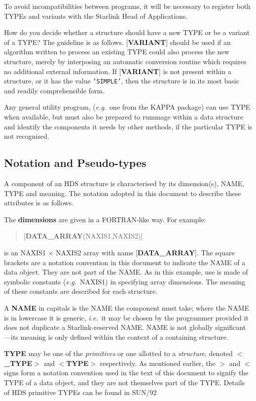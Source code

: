 \documentclass[twoside,11pt]{article}
\newcommand{\xref}[3]{#1}
\newcommand{\xlabel}[1]{}
\begin{document}
To avoid incompatibilities between programs, it will be necessary to
register both TYPEs and variants with the Starlink Head of Applications. 

How do you decide whether a structure should have
a new TYPE or be a variant of a TYPE?  The guideline is as
follows.  {[}{\bf VARIANT}{]} should be used
if an algorithm written to process an existing TYPE could also process
the new structure, merely by interposing an automatic conversion routine
which requires no additional external information.
If {[}{\bf VARIANT}{]} is not present within a structure,
or it has the value {\tt `SIMPLE'},
then the structure is in its most basic and readily
comprehensible form.

Any general utility program, ({\it e.g.}\  one from the
{\small KAPPA} package) can use TYPE
when available, but must also be prepared
to rummage within a data structure
and identify the components it needs by other methods, if the particular
TYPE is not recognised.

\subsection{\xlabel{se_notation}Notation and Pseudo-types\label{se:notation}}

A component of an HDS structure is characterised
by its dimension(s), NAME, TYPE and meaning.  The
notation adopted in this document to describe these
attributes is as follows.

The {\bf dimensions} are given in a FORTRAN-like way.
For example:
\begin{verse}
   {[}{\bf DATA\_ARRAY}(NAXIS1,NAXIS2){]}
\end{verse}
is an NAXIS1 $\times$ NAXIS2 array with name
{[}{\bf DATA\_ARRAY}{]}.
The square brackets are a notation convention
in this document to indicate the
NAME of a data object. They are not part of the NAME.
As in this example, use is made of symbolic constants ({\it e.g.}\  NAXIS1)
in specifying array dimensions.
The meaning of these constants are described for each structure.

A {\bf NAME} in capitals is the NAME the component must take; where the NAME
is in lowercase it is generic, {\it i.e.}\  it may be chosen by the
programmer provided it does not duplicate a Starlink-reserved NAME.
NAME is not globally significant---its meaning is only defined within
the context of a containing structure.

{\bf TYPE} may be one of the {\it primitives} or one
allotted to a {\it structure},
denoted $<${\bf \_TYPE}$>$ and
$<${\bf TYPE}$>$ respectively. As mentioned earlier, the $>$ and
$<$ signs form a notation convention used in the text of this
document to signify the TYPE of a data object, and they are not
themselves part of the TYPE. Details of
HDS primitive TYPEs can be found in \xref{SUN/92}{sun92}.
\end{document}
